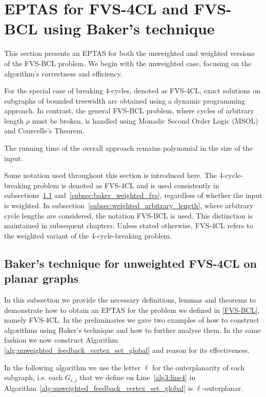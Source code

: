 \section{EPTAS for FVS-4CL and FVS-BCL using Baker's technique}
\label{section:eptas}

This section presents an EPTAS for both the unweighted and weighted versions of 
the FVS-BCL problem. We begin with the unweighted case, focusing on the algorithm's 
correctness and efficiency.

For the special case of breaking 4-cycles, denoted as FVS-4CL, exact solutions on subgraphs 
of bounded treewidth are obtained using a dynamic programming approach. In contrast, 
the general FVS-BCL problem, where cycles of arbitrary length $\rho$ must be broken, is handled using Monadic Second Order Logic (MSOL) and Courcelle’s Theorem.

The running time of the overall approach remains polynomial in the size of the input.

Some notation used throughout this section is introduced here. 
The 4-cycle-breaking problem is denoted as FVS-4CL and is used consistently in 
subsections~\ref{subsec:baker_unweighted_fvs} and~\ref{subsec:baker_weighted_fvs}, 
regardless of whether the input is weighted. In subsection~\ref{subsec:weighted_arbitrary_length}, 
where arbitrary cycle lengths are considered, the notation FVS-BCL is used. 
This distinction is maintained in subsequent chapters. Unless stated otherwise, 
FVS-4CL refers to the weighted variant of the 4-cycle-breaking problem.

\subsection{Baker's technique for unweighted FVS-4CL on planar graphs}
\label{subsec:baker_unweighted_fvs}

In this subsection we provide the necessary definitions, lemmas and theorems to demonstrate how to obtain an EPTAS for the problem 
we defined in \ref{FVS-BCL}, namely FVS-4CL. In the preliminaries we gave two examples of how to construct algorithms using Baker's technique 
and how to further analyse them. In the same fashion we now construct Algorithm \ref{alg:unweighted_feedback_vertex_set_global} and reason for its effectiveness.

 In the following algorithm we use the letter $\ell$ for the outerplanarity of each subgraph, i.e. each $G_{i, j}$ that we 
define on Line~\ref{alg3:line4} in Algorithm~\ref{alg:unweighted_feedback_vertex_set_global} is $\ell$-outerplanar.

